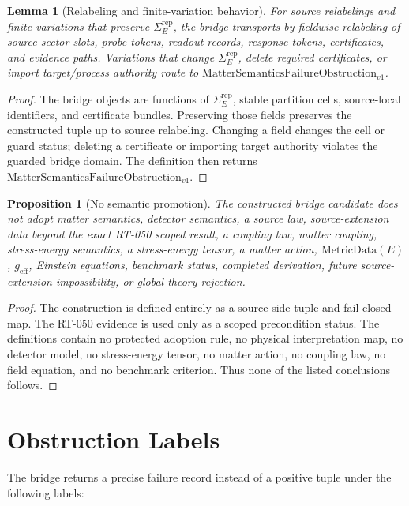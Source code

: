 \documentclass[11pt]{article}
\newcommand{\MSSig}{\Sigma^{\mathrm{rep}}_E}
\newcommand{\FailureObs}{\mathrm{MatterSemanticsFailureObstruction}_{v1}}
\newcommand{\MetricData}{\mathrm{MetricData}}
\newcommand{\geff}{g_{\mathrm{eff}}}
\newtheorem{proposition}{Proposition}
\newtheorem{lemma}{Lemma}
\begin{document}
\begin{lemma}[Relabeling and finite-variation behavior]
For source relabelings and finite variations that preserve \(\MSSig\), the
bridge transports by fieldwise relabeling of source-sector slots, probe
tokens, readout records, response tokens, certificates, and evidence paths.
Variations that change \(\MSSig\), delete required certificates, or import
target/process authority route to \(\FailureObs\).
\end{lemma}

\begin{proof}
The bridge objects are functions of \(\MSSig\), stable partition cells,
source-local identifiers, and certificate bundles. Preserving those fields
preserves the constructed tuple up to source relabeling. Changing a field
changes the cell or guard status; deleting a certificate or importing target
authority violates the guarded bridge domain. The definition then returns
\(\FailureObs\).
\end{proof}

\begin{proposition}[No semantic promotion]
The constructed bridge candidate does not adopt matter semantics, detector
semantics, a source law, source-extension data beyond the exact RT-050 scoped
result, a coupling law, matter coupling, stress-energy semantics, a
stress-energy tensor, a matter action, \(\MetricData(E)\), \(\geff\), Einstein
equations, benchmark status, completed derivation, future source-extension
impossibility, or global theory rejection.
\end{proposition}

\begin{proof}
The construction is defined entirely as a source-side tuple and fail-closed
map. The RT-050 evidence is used only as a scoped precondition status. The
definitions contain no protected adoption rule, no physical interpretation
map, no detector model, no stress-energy tensor, no matter action, no
coupling law, no field equation, and no benchmark criterion. Thus none of the
listed conclusions follows.
\end{proof}

\section{Obstruction Labels}

The bridge returns a precise failure record instead of a positive tuple under
the following labels:
\end{document}
